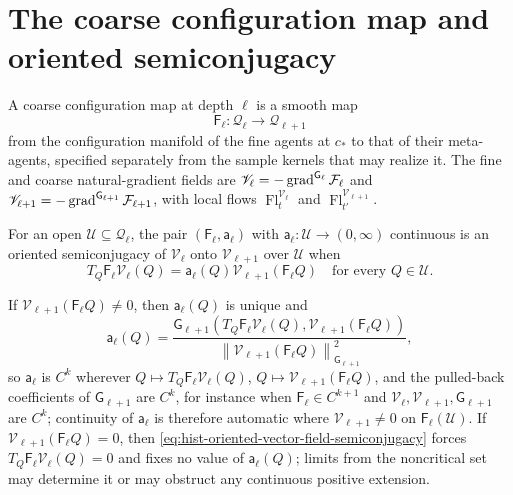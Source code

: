 \section{The coarse configuration map and oriented semiconjugacy}
\label{sec:hist-configuration-coarse-map}
\label{sec:hist-independent-flows}

A coarse configuration map at depth $\ell$ is a smooth map
\begin{equation}
\mathsf F_\ell:\mathcal Q_\ell\longrightarrow\mathcal Q_{\ell+1}
\label{eq:hist-configuration-coarse-map}
\end{equation}
from the configuration manifold of the fine agents at $c_*$ to that of their meta-agents,
specified separately from the sample kernels that may realize it.  The fine and coarse
natural-gradient fields are
$\mathscr V_\ell=-\operatorname{grad}^{\mathsf G_\ell}\mathcal F_\ell$ and
$\mathscr V_{\ell+1}=-\operatorname{grad}^{\mathsf G_{\ell+1}}\mathcal F_{\ell+1}$, with
local flows $\operatorname{Fl}^{\mathscr V_\ell}_t$ and
$\operatorname{Fl}^{\mathscr V_{\ell+1}}_{t'}$.

For an open $\mathcal U\subseteq\mathcal Q_\ell$, the pair $(\mathsf F_\ell,\mathsf
a_\ell)$ with $\mathsf a_\ell:\mathcal U\to(0,\infty)$ continuous is an oriented
semiconjugacy of $\mathscr V_\ell$ onto $\mathscr V_{\ell+1}$ over $\mathcal U$ when
\begin{equation}
T_Q\mathsf F_\ell \mathscr V_\ell(Q)
=\mathsf a_\ell(Q) \mathscr V_{\ell+1}(\mathsf F_\ell Q)
\quad\text{for every }Q\in\mathcal U.
\label{eq:hist-oriented-vector-field-semiconjugacy}
\end{equation}

If $\mathscr V_{\ell+1}(\mathsf F_\ell Q)\ne0$, then $\mathsf a_\ell(Q)$ is unique and
\begin{equation}
\mathsf a_\ell(Q)
=\frac{\mathsf G_{\ell+1}
\left(T_Q\mathsf F_\ell \mathscr V_\ell(Q),\mathscr V_{\ell+1}(\mathsf F_\ell Q)\right)}
{\left\lVert\mathscr V_{\ell+1}(\mathsf F_\ell Q)\right\rVert^2_{\mathsf G_{\ell+1}}},
\label{eq:hist-semiconjugacy-factor-formula}
\end{equation}
so $\mathsf a_\ell$ is $C^k$ wherever $Q\mapsto T_Q\mathsf F_\ell\mathscr V_\ell(Q)$,
$Q\mapsto\mathscr V_{\ell+1}(\mathsf F_\ell Q)$, and the pulled-back coefficients of
$\mathsf G_{\ell+1}$ are $C^k$, for instance when $\mathsf F_\ell\in C^{k+1}$ and
$\mathscr V_\ell,\mathscr V_{\ell+1},\mathsf G_{\ell+1}$ are $C^k$; continuity of
$\mathsf a_\ell$ is therefore automatic where $\mathscr V_{\ell+1}\ne0$ on
$\mathsf F_\ell(\mathcal U)$.  If $\mathscr V_{\ell+1}(\mathsf F_\ell Q)=0$, then
\eqref{eq:hist-oriented-vector-field-semiconjugacy} forces
$T_Q\mathsf F_\ell\mathscr V_\ell(Q)=0$ and fixes no value of $\mathsf a_\ell(Q)$; limits
from the noncritical set may determine it or may obstruct any continuous positive
extension.  

